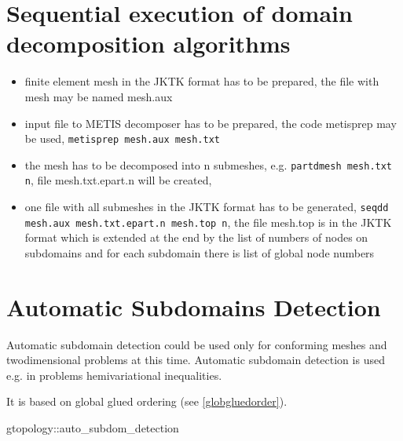 \section{Sequential execution of domain decomposition algorithms}

\begin{itemize}
\item
finite element mesh in the JKTK format has to be prepared, the file with mesh may be
named mesh.aux
\item
input file to METIS decomposer has to be prepared, the code metisprep may be used,
{\tt metisprep mesh.aux mesh.txt}
\item
the mesh has to be decomposed into n submeshes, e.g.
{\tt partdmesh mesh.txt n}, file mesh.txt.epart.n will be created,
\item
one file with all submeshes in the JKTK format has to be generated,
{\tt seqdd mesh.aux mesh.txt.epart.n mesh.top n}, the file mesh.top is in the
JKTK format which is extended at the end by the list of numbers of nodes on 
subdomains and for each subdomain there is list of global node numbers
\end{itemize}

\section{Automatic Subdomains Detection}

Automatic subdomain detection could be used only for conforming meshes and
twodimensional problems at this time.
Automatic subdomain detection is used e.g. in problems hemivariational inequalities.

It is based on global glued ordering (see \ref{globgluedorder}).

gtopology::auto\_subdom\_detection

